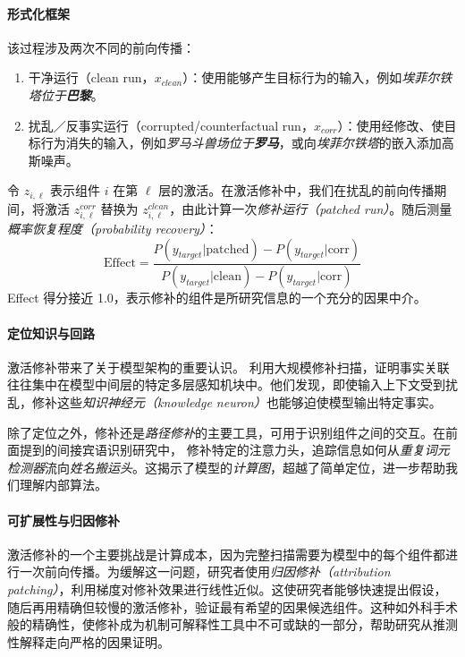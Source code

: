\paragraph{形式化框架}
该过程涉及两次不同的前向传播：
\begin{enumerate}
    \item 干净运行（clean run，$x_{clean}$）：使用能够产生目标行为的输入，例如{\em 埃菲尔铁塔位于\textbf{巴黎}}。
    \item 扰乱／反事实运行（corrupted/counterfactual run，$x_{corr}$）：使用经修改、使目标行为消失的输入，例如{\em 罗马斗兽场位于\textbf{罗马}}，或向{\em 埃菲尔铁塔}的嵌入添加高斯噪声。
\end{enumerate}

令 $z_{i, \ell}$ 表示组件 $i$ 在第 $\ell$ 层的激活。在激活修补中，我们在扰乱的前向传播期间，将激活 $z^{corr}_{i, \ell}$ 替换为 $z^{clean}_{i, \ell}$，由此计算一次\emph{修补运行（patched run）}。随后测量\emph{概率恢复程度（probability recovery）}：
\begin{equation}
    \text{Effect} = \frac{P(y_{target} | \text{patched}) - P(y_{target} | \text{corr})}{P(y_{target} | \text{clean}) - P(y_{target} | \text{corr})}
\end{equation}
Effect 得分接近 1.0，表示修补的组件是所研究信息的一个充分的因果中介。


\paragraph{定位知识与回路}
激活修补带来了关于模型架构的重要认识。\citet{meng2022locating} 利用大规模修补扫描，证明事实关联往往集中在模型中间层的特定多层感知机块中。他们发现，即使输入上下文受到扰乱，修补这些\emph{知识神经元（knowledge neuron）}也能够迫使模型输出特定事实。

除了定位之外，修补还是\emph{路径修补}的主要工具，可用于识别组件之间的交互。在前面提到的间接宾语识别研究中，\citet{wang2022interpretability} 修补特定的注意力头，追踪信息如何从{\em 重复词元检测器}流向{\em 姓名搬运头}。这揭示了模型的\emph{计算图}，超越了简单定位，进一步帮助我们理解内部算法。

\paragraph{可扩展性与归因修补}
激活修补的一个主要挑战是计算成本，因为完整扫描需要为模型中的每个组件都进行一次前向传播。为缓解这一问题，研究者使用\emph{归因修补（attribution patching）}\citep{syed2024attribution}，利用梯度对修补效果进行线性近似。这使研究者能够快速提出假设，随后再用精确但较慢的激活修补，验证最有希望的因果候选组件。这种如外科手术般的精确性，使修补成为机制可解释性工具中不可或缺的一部分，帮助研究从推测性解释走向严格的因果证明。



